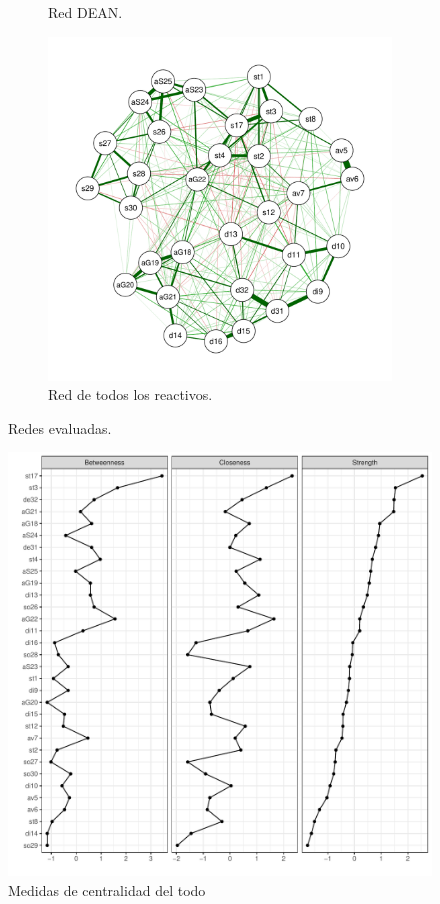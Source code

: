 \documentclass[11pt,spanish]{article}\usepackage[]{graphicx}\usepackage[]{color}
\begin{document}
\begin{figure}
\begin{subfigure}{0.45\textwidth}
    \caption{Red DEAN.}
    \label{fig:netdean}
\end{subfigure}
\hfill
\begin{subfigure}{0.7\textwidth}
    \includegraphics[width=\textwidth]{images/net_todo.pdf}
    \caption{Red de todos los reactivos.}
    \label{fig:nettodos}
\end{subfigure}
        
\caption{Redes evaluadas.}
\label{fig:figures}
\end{figure}


\begin{figure}[ht]
\centering
\includegraphics[scale=0.7]{images/centrality_net_todo.pdf}
\caption{Medidas de centralidad del todo}
\end{figure}
\end{document}
